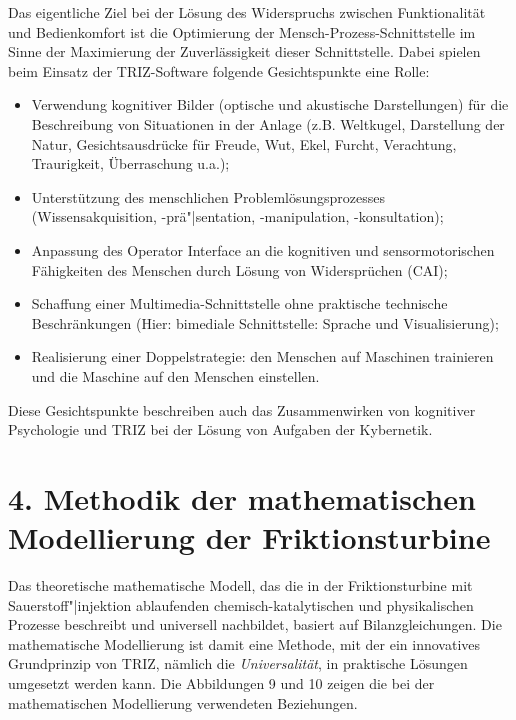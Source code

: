 \documentclass[11pt,a4paper]{article}
\begin{document}
Das eigentliche Ziel bei der Lösung des Widerspruchs zwischen Funktionalität
und Bedienkomfort ist die Optimierung der Mensch-Prozess-Schnittstelle im Sinne
der Maximierung der Zuverlässigkeit dieser Schnittstelle. Dabei spielen beim
Einsatz der TRIZ-Software folgende Gesichtspunkte eine Rolle:
\begin{itemize}
\item Verwendung kognitiver Bilder (optische und akustische Darstellungen) für
  die Beschreibung von Situationen in der Anlage (z.B. Weltkugel, Darstellung
  der Natur, Gesichtsausdrücke für Freude, Wut, Ekel, Furcht, Verachtung,
  Traurigkeit, Überraschung u.a.);
\item Unterstützung des menschlichen Problemlösungsprozesses
  (Wissensakquisition, -prä"|sentation, -manipulation, -konsultation);
\item Anpassung des Operator Interface an die kognitiven und sensormotorischen
  Fähigkeiten des Menschen durch Lösung von Widersprüchen (CAI); 
\item Schaffung einer Multimedia-Schnittstelle ohne praktische technische
  Beschränkungen (Hier: bimediale Schnittstelle: Sprache und Visualisierung); 
\item Realisierung einer Doppelstrategie: den Menschen auf Maschinen trainieren
  und die Maschine auf den Menschen einstellen.
\end{itemize}
Diese Gesichtspunkte beschreiben auch das Zusammenwirken von kognitiver
Psychologie und TRIZ bei der Lösung von Aufgaben der Kybernetik.

\section*{4. Methodik der mathematischen Modellierung
  der Friktionsturbine} 

Das theoretische mathematische Modell, das die in der Friktionsturbine mit
Sauerstoff"|injektion ablaufenden chemisch-katalytischen und physikalischen
Prozesse beschreibt und universell nachbildet, basiert auf
Bilanzgleichungen. Die mathematische Modellierung ist damit eine Methode, mit
der ein innovatives Grundprinzip von TRIZ, nämlich die \emph{Universalität}, in
praktische Lösungen umgesetzt werden kann.  Die Abbildungen 9 und 10 zeigen die
bei der mathematischen Modellierung verwendeten Beziehungen.
\end{document}
